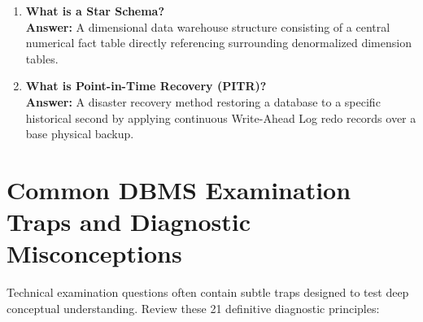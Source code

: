 \begin{enumerate}[label=\textbf{TB\arabic*.},leftmargin=1.2cm]
\item \textbf{What is a Star Schema?} \\
\textbf{Answer:} A dimensional data warehouse structure consisting of a central numerical fact table directly referencing surrounding denormalized dimension tables.

\item \textbf{What is Point-in-Time Recovery (PITR)?} \\
\textbf{Answer:} A disaster recovery method restoring a database to a specific historical second by applying continuous Write-Ahead Log redo records over a base physical backup.
\end{enumerate}

\section{Common DBMS Examination Traps and Diagnostic Misconceptions}
\label{sec:dbms_exam_traps}

Technical examination questions often contain subtle traps designed to test deep conceptual understanding. Review these 21 definitive diagnostic principles:

